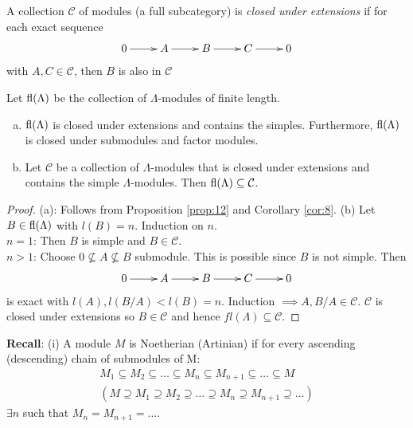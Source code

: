 \begin{defin}
  A collection \(\mathcal{C}\) of modules (a full subcategory) is
  \emph{closed under extensions} if for each exact sequence
    \begin{align*}
        \xymatrix{0\ar[r] & A\ar[r] & B\ar[r] & C\ar[r] & 0}
    \end{align*}
    with \(A, C\in\mathcal{C}\), then \(B\) is also in \(\mathcal{C}\)
\end{defin}
Let $\operatorname{fl}\nolimits(\Lambda)$ be the collection of \(\Lambda\)-modules of finite length.
\begin{prop}\label{prop:13}
\begin{enumerate}[(a)]
\item \(\operatorname{fl}\nolimits(\Lambda)\) is closed under extensions and contains the
  simples. Furthermore, \(\operatorname{fl}\nolimits(\Lambda)\) is closed under submodules
  and factor modules.
\item Let \(\mathcal{C}\) be a collection of \(\Lambda\)-modules that
  is closed under extensions and contains the simple
  \(\Lambda\)-modules. Then \(\operatorname{fl}\nolimits(\Lambda)\subseteq\mathcal{C}\). 
\end{enumerate}
\end{prop}
\begin{proof}(a): Follows from Proposition \ref{prop:12} and Corollary
  \ref{cor:8}. 
(b) Let \(B\in \operatorname{fl}\nolimits(\Lambda)\) with \(l(B) = n\). Induction on \(n\).\\
\noindent \(n = 1\): Then \(B\) is simple and \(B\in\mathcal{C}\).\\
\noindent\(n>1\): Choose \(0\not\subseteq A\not\subseteq B\)
submodule. This is possible since \(B\) is not simple. Then 
\begin{align*}
    \xymatrix{0\ar[r] & A\ar[r] & B\ar[r] & C\ar[r] & 0}
\end{align*}
is exact with \(l(A),l(B/A)<l(B) = n\). Induction \(\implies A,
B/A\in\mathcal{C}\). \(\mathcal{C}\) is closed under extensions so
\(B\in\mathcal{C}\) and hence \(fl(\Lambda) \subseteq \mathcal{C}\). 
\end{proof}
\noindent\textbf{Recall}: (i) A module \(M\) is Noetherian (Artinian)
if for every ascending (descending) chain of submodules of M: 
\begin{gather*}
    M_1\subseteq M_2\subseteq\dots\subseteq M_n \subseteq M_{n+1} \subseteq\dots\subseteq M \\
    (M \supseteq M_1\supseteq M_2\supseteq\dots\supseteq M_n \supseteq M_{n+1} \supseteq\dots)
\end{gather*}
\(\exists n\) such that \(M_n = M_{n+1} = \dots\).

